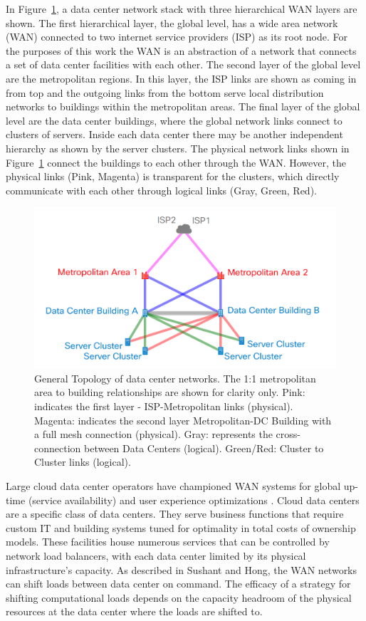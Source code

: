 In Figure~\ref{fig:net_diag}, a data center network stack with three hierarchical WAN layers are shown. The first hierarchical layer, the global level, has a wide area network (WAN) connected to two internet service providers (ISP) as its root node. For the purposes of this work the WAN is an abstraction of a network that connects a set of data center facilities with each other. The second layer of the global level are the metropolitan regions. In this layer, the ISP links are shown as coming in from top and the outgoing links from the bottom serve local distribution networks to buildings within the metropolitan areas. The final layer of the global level are the data center buildings, where the global network links connect to clusters of servers. Inside each data center there may be another independent hierarchy as shown by the server clusters. The physical network links shown in Figure~\ref{fig:net_diag} connect the buildings to each other through the WAN. However, the physical links (Pink, Magenta) is transparent for the clusters, which directly communicate with each other through logical links (Gray, Green, Red).

\begin{figure}
  \centering
  \includegraphics[scale=.2]{marginal_energy_cost/img/net_diag.png}
  \caption[Generic Network Topology]{General Topology of data center networks. The 1:1 metropolitan area to building relationships are shown for clarity only. Pink: indicates the first layer - ISP-Metropolitan links (physical). Magenta: indicates the second layer Metropolitan-DC Building with a full mesh connection (physical). Gray: represents the cross-connection between Data Centers (logical). Green/Red: Cluster to Cluster links (logical).}
  \label{fig:net_diag}
  \end{figure}


Large cloud data center operators have championed WAN systems for global up-time (service availability) and user experience optimizations \citep{sushant13} \citep{hong13}. Cloud data centers are a specific class of data centers. They serve business functions that require custom IT and building systems tuned for optimality in total costs of ownership models. These facilities house numerous services that can be controlled by network load balancers, with each data center limited by its physical infrastructure's capacity. As described in Sushant and Hong, the WAN networks can shift loads between data center on command.  The efficacy of a strategy for shifting computational loads depends on the capacity headroom of the physical resources at the data center where the loads are shifted to. 

